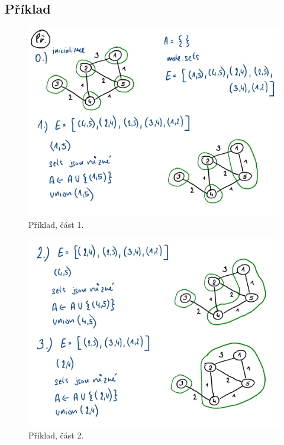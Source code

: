 \subsection{Příklad}

\begin{figure}[H]
    \centering
    \includegraphics[width=0.9\linewidth]{03-minimalni-kostry-11.pdf}
    \caption{Příklad, část 1.}
\end{figure}

\begin{figure}[H]
    \centering
    \includegraphics[width=0.9\linewidth]{03-minimalni-kostry-12.pdf}
    \caption{Příklad, část 2.}
\end{figure}

